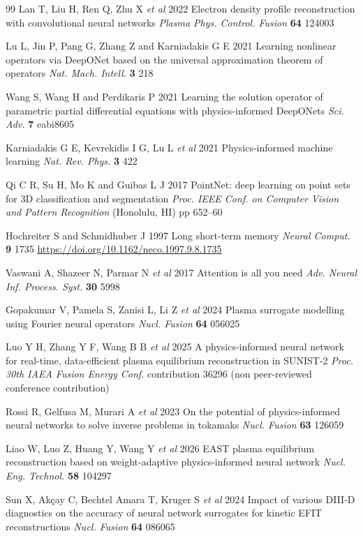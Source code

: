 \documentclass[a4paper,12pt]{article}
\begin{document}
\begin{thebibliography}{99}
Lan T, Liu H, Ren Q, Zhu X \textit{et al} 2022 Electron density profile reconstruction with convolutional neural networks \textit{Plasma Phys. Control. Fusion} \textbf{64} 124003

Lu L, Jin P, Pang G, Zhang Z and Karniadakis G E 2021 Learning nonlinear operators via DeepONet based on the universal approximation theorem of operators \textit{Nat. Mach. Intell.} \textbf{3} 218

Wang S, Wang H and Perdikaris P 2021 Learning the solution operator of parametric partial differential equations with physics-informed DeepONets \textit{Sci. Adv.} \textbf{7} eabi8605

Karniadakis G E, Kevrekidis I G, Lu L \textit{et al} 2021 Physics-informed machine learning \textit{Nat. Rev. Phys.} \textbf{3} 422

Qi C R, Su H, Mo K and Guibas L J 2017 PointNet: deep learning on point sets for 3D classification and segmentation \textit{Proc. IEEE Conf. on Computer Vision and Pattern Recognition} (Honolulu, HI) pp 652--60

Hochreiter S and Schmidhuber J 1997 Long short-term memory \textit{Neural Comput.} \textbf{9} 1735 \url{https://doi.org/10.1162/neco.1997.9.8.1735}

Vaswani A, Shazeer N, Parmar N \textit{et al} 2017 Attention is all you need \textit{Adv. Neural Inf. Process. Syst.} \textbf{30} 5998

Gopakumar V, Pamela S, Zanisi L, Li Z \textit{et al} 2024 Plasma surrogate modelling using Fourier neural operators \textit{Nucl. Fusion} \textbf{64} 056025

Luo Y H, Zhang Y F, Wang B B \textit{et al} 2025 A physics-informed neural network for real-time, data-efficient plasma equilibrium reconstruction in SUNIST-2 \textit{Proc. 30th IAEA Fusion Energy Conf.} contribution 36296 (non peer-reviewed conference contribution)

Rossi R, Gelfusa M, Murari A \textit{et al} 2023 On the potential of physics-informed neural networks to solve inverse problems in tokamaks \textit{Nucl. Fusion} \textbf{63} 126059

Liao W, Luo Z, Huang Y, Wang Y \textit{et al} 2026 EAST plasma equilibrium reconstruction based on weight-adaptive physics-informed neural network \textit{Nucl. Eng. Technol.} \textbf{58} 104297

Sun X, Ak\c{c}ay C, Bechtel Amara T, Kruger S \textit{et al} 2024 Impact of various DIII-D diagnostics on the accuracy of neural network surrogates for kinetic EFIT reconstructions \textit{Nucl. Fusion} \textbf{64} 086065

\end{thebibliography}
\end{document}
